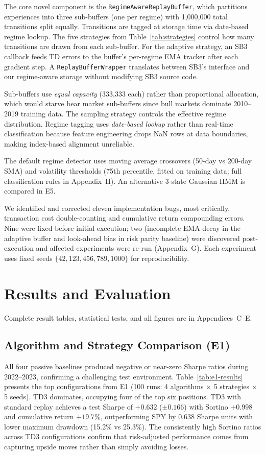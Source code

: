 \documentclass[11pt,a4paper]{article}
\begin{document}
The core novel component is the \texttt{RegimeAwareReplayBuffer}, which partitions experiences into three sub-buffers (one per regime) with 1,000,000 total transitions split equally. Transitions are tagged at storage time via date-based regime lookup. The five strategies from Table~\ref{tab:strategies} control how many transitions are drawn from each sub-buffer. For the adaptive strategy, an SB3 callback feeds TD errors to the buffer's per-regime EMA tracker after each gradient step. A \texttt{ReplayBufferWrapper} translates between SB3's interface and our regime-aware storage without modifying SB3 source code.

Sub-buffers use \textit{equal capacity} (333,333 each) rather than proportional allocation, which would starve bear market sub-buffers since bull markets dominate 2010--2019 training data. The sampling strategy controls the effective regime distribution. Regime tagging uses \textit{date-based lookup} rather than real-time classification because feature engineering drops NaN rows at data boundaries, making index-based alignment unreliable.

The default regime detector uses moving average crossovers (50-day vs 200-day SMA) and volatility thresholds (75th percentile, fitted on training data; full classification rules in Appendix~H). An alternative 3-state Gaussian HMM is compared in E5.

We identified and corrected eleven implementation bugs, most critically, transaction cost double-counting and cumulative return compounding errors. Nine were fixed before initial execution; two (incomplete EMA decay in the adaptive buffer and look-ahead bias in risk parity baseline) were discovered post-execution and affected experiments were re-run (Appendix~G). Each experiment uses fixed seeds $\{42, 123, 456, 789, 1000\}$ for reproducibility.


\section{Results and Evaluation}
\label{sec:results}

Complete result tables, statistical tests, and all figures are in Appendices~C--E.

\subsection{Algorithm and Strategy Comparison (E1)}

All four passive baselines produced negative or near-zero Sharpe ratios during 2022--2023, confirming a challenging test environment. Table~\ref{tab:e1-results} presents the top configurations from E1 (100 runs: 4 algorithms $\times$ 5 strategies $\times$ 5 seeds). TD3 dominates, occupying four of the top six positions. TD3 with standard replay achieves a test Sharpe of $+0.632$ ($\pm 0.166$) with Sortino $+0.998$ and cumulative return $+19.7\%$, outperforming SPY by $0.638$ Sharpe units with lower maximum drawdown (15.2\% vs 25.3\%). The consistently high Sortino ratios across TD3 configurations confirm that risk-adjusted performance comes from capturing upside moves rather than simply avoiding losses.
\end{document}
